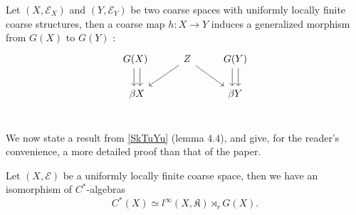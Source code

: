 \begin{prop}
Let $(X,\mathcal E_X)$ and $(Y,\mathcal E_Y)$ be two coarse spaces with uniformly locally finite coarse structures, then a coarse map $h :X\rightarrow Y$ induces a generalized morphism from $G(X)$ to $G(Y)$ :
\[\begin{tikzcd}
G(X)\arrow[xshift=-0.7ex]{d}\arrow[xshift=0.7ex]{d} \ & \arrow{dl} Z \arrow{dr} & G(Y)\arrow[xshift=-0.7ex]{d}\arrow[xshift=0.7ex]{d} \\
\beta X & &\beta Y \\
\end{tikzcd}\] 
\end{prop}

We now state a result from \ref{SkTuYu} (lemma $4.4$), and give, for the reader's convenience, a more detailed proof than that of the paper.\\

\begin{prop}
Let $(X,\mathcal E)$ be a uniformly locally finite coarse space, then we have an isomorphism of $C^*$-algebras
\[C^*(X) \simeq l^\infty(X,\mathfrak K) \rtimes_r G(X).\]
\end{prop}

